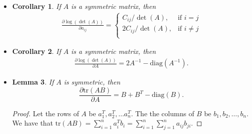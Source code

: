 \documentclass[10pt]{article}
\newtheorem{lemma}{Lemma}[section]
\newtheorem{corollary}[lemma]{Corollary}
\newcommand{\tr}{\mathrm{tr}}
\newcommand{\sgn}{\mathrm{sgn}}
\newcommand{\diag}{\mathrm{diag}}
\begin{document}
\begin{itemize}
\begin{proof}
\begin{align*}
      &\phantom{\ =\ } + 
      \bigg( \sum_{\substack{\pi(i) = j\\\pi(j) =  i}} \sgn(\pi) \prod_{k\neq j} a_{k\pi(k)} + \sum_{\substack{\pi(i) \neq j\\\pi(j) =  i}} \sgn(\pi) \prod_{k\neq j} a_{k\pi(k)} \bigg)\\
      &= \sum_{\pi(i) = j} \sgn(\pi) \prod_{k\neq j} a_{k\pi(k)}
      + \sum_{\pi(j) = i} \sgn(\pi) \prod_{k\neq i} a_{k\pi(k)}\\
      &= C_{ij} + C_{ji} = 2C_{ij}.
      \end{align*}
      The last line follows from the fact that $A$ is symmetric, so the cofactors are symmetric as well.
    \end{proof}
    
    \item \begin{corollary} \label{log-det-deriv-elem}
      If $A$ is a symmetric matrix, then
      \begin{align*}
        \frac{\partial \log(\det(A))}{\partial a_{ij}} =
        \begin{cases}
          C_{ij}/\det(A), & \mbox{if }i = j\\
          2C_{ij}/\det(A), & \mbox{if }i \neq j\\
        \end{cases}        
      \end{align*}
    \end{corollary}
    
    \item \begin{corollary} \label{log-det-deriv}
      If $A$ is a symmetric matrix, then 
      \begin{align*}
        \frac{\partial \log(\det(A))}{\partial A} = 2A^{-1}- \diag(A^{-1}).
      \end{align*}          
    \end{corollary}    
        
    \item \begin{lemma} \label{trace-deriv}
      If $A$ is symmetric, then
      $$\frac{\partial \tr(AB)}{\partial A} = B + B^T - \diag(B).$$
    \end{lemma}
    \begin{proof}
      Let the rows of $A$ be $a_1^T, a_2^T, \dotsc a_n^T$. The the columns of $B$ be $b_1, b_2, \dotsc, b_n$. We have that $\tr(AB) = \sum_{i=1}^n a_i^T b_i = \sum_{i=1}^n \sum_{j=1}^n a_{ij} b_{ji}$.
      

\end{proof}
\end{itemize}
\end{document}
